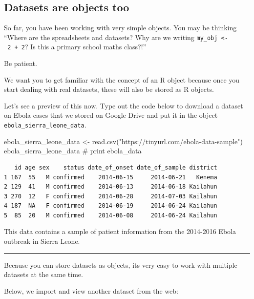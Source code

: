 \documentclass[
  letterpaper,
  DIV=11,
  numbers=noendperiod]{scrreprt}
\newenvironment{Shaded}{\begin{snugshade}}{\end{snugshade}}
\newcommand{\CommentTok}[1]{\textcolor[rgb]{0.37,0.37,0.37}{#1}}
\newcommand{\FunctionTok}[1]{\textcolor[rgb]{0.28,0.35,0.67}{#1}}
\newcommand{\NormalTok}[1]{\textcolor[rgb]{0.00,0.23,0.31}{#1}}
\newcommand{\OtherTok}[1]{\textcolor[rgb]{0.00,0.23,0.31}{#1}}
\newcommand{\StringTok}[1]{\textcolor[rgb]{0.13,0.47,0.30}{#1}}
\begin{document}
\hypertarget{datasets-are-objects-too}{%
\subsection{Datasets are objects too}\label{datasets-are-objects-too}}

So far, you have been working with very simple objects. You may be
thinking ``Where are the spreadsheets and datasets? Why are we writing
\texttt{my\_obj\ \textless{}-\ 2\ +\ 2}? Is this a primary school maths
class?!''

Be patient.

We want you to get familiar with the concept of an R object because once
you start dealing with real datasets, these will also be stored as R
objects.

Let's see a preview of this now. Type out the code below to download a
dataset on Ebola cases that we stored on Google Drive and put it in the
object \texttt{ebola\_sierra\_leone\_data}.

\begin{Shaded}
\begin{Highlighting}[]
\NormalTok{ebola\_sierra\_leone\_data }\OtherTok{\textless{}{-}} \FunctionTok{read.csv}\NormalTok{(}\StringTok{"https://tinyurl.com/ebola{-}data{-}sample"}\NormalTok{)}
\NormalTok{ebola\_sierra\_leone\_data }\CommentTok{\# print ebola\_data}
\end{Highlighting}
\end{Shaded}

\begin{verbatim}
   id age sex    status date_of_onset date_of_sample district
1 167  55   M confirmed    2014-06-15     2014-06-21   Kenema
2 129  41   M confirmed    2014-06-13     2014-06-18 Kailahun
3 270  12   F confirmed    2014-06-28     2014-07-03 Kailahun
4 187  NA   F confirmed    2014-06-19     2014-06-24 Kailahun
5  85  20   M confirmed    2014-06-08     2014-06-24 Kailahun
\end{verbatim}

This data contains a sample of patient information from the 2014-2016
Ebola outbreak in Sierra Leone.

\begin{center}\rule{0.5\linewidth}{0.5pt}\end{center}

Because you can store datasets as objects, its very easy to work with
multiple datasets at the same time.

Below, we import and view another dataset from the web:
\end{document}
